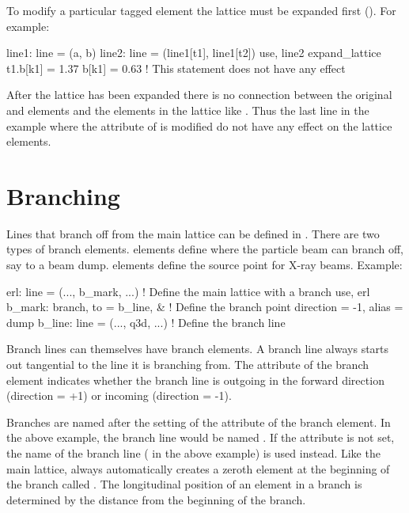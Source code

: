 To modify a particular tagged element the lattice must be expanded
first (). For example:
\begin{example}
  line1: line = (a, b)
  line2: line = (line1[t1], line1[t2])
  use, line2
  expand_lattice
  t1.b[k1] = 1.37
  b[k1] = 0.63       ! This statement does not have any effect
\end{example}
After the lattice has been expanded there is no connection between 
the original  and  elements and the elements in the lattice like
. Thus the last line in the example where the  attribute of 
is modified do not have any effect on the lattice elements. 

\section{Branching}
\label{s:branching}

Lines that branch off from the main lattice can be defined in
\bmad. There are two types of branch elements.  elements define
where the particle beam can branch off, say to a beam dump.
 elements define the source point for X-ray beams.
Example:
\begin{example}
  erl: line = (..., b_mark, ...)             ! Define the main lattice with a branch 
  use, erl
  b_mark: branch, to = b_line, &             ! Define the branch point
               direction = -1, alias = dump  
  b_line: line = (..., q3d, ...)             ! Define the branch line
\end{example}

Branch lines can themselves have branch elements. A branch line always
starts out tangential to the line it is branching from. The
 attribute of the branch element indicates whether the
branch line is outgoing in the forward direction (direction = +1) or
incoming (direction = -1).

Branches are named after the setting of the  attribute of
the branch element. In the above example, the branch line would be
named . If the  attribute is not set, the name of
the branch line ( in the above example) is used instead.
Like the main lattice, \bmad always automatically creates a zeroth
element at the beginning of the branch called . The
longitudinal  position of an element in a branch is determined
by the distance from the beginning of the branch.
